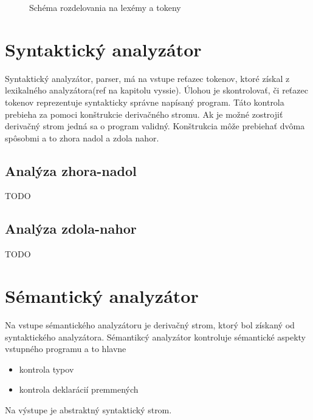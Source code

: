 \begin{center}
\begin{figure}
\caption{Schéma rozdelovania na lexémy a tokeny}
\label{fig:lex}

\end{figure}
\end{center}


\section{Syntaktický analyzátor}
Syntaktický analyzátor, parser, má na vstupe reťazec tokenov, ktoré získal
z lexikalného analyzátora(ref na kapitolu vyssie). Úlohou je skontrolovať, či
reťazec tokenov reprezentuje syntakticky správne napísaný program. Táto kontrola
prebieha za pomoci konštrukcie derivačného stromu. Ak je možné zostrojiť derivačný strom
jedná sa o program validný. Konštrukcia môže prebiehať dvôma spôsobmi a to zhora
nadol a zdola nahor.

\subsection{Analýza zhora-nadol}
TODO
\subsection{Analýza zdola-nahor}
TODO

\section{Sémantický analyzátor}
Na vstupe sémantického analyzátoru je derivačný strom, ktorý bol získaný od
syntaktického analyzátora. Sémantikcý analyzátor kontroluje sémantické aspekty
vstupného programu a to hlavne 
\begin{itemize}
    \item kontrola typov
    \item kontrola deklarácií premmených
\end{itemize}
Na výstupe je abstraktný syntaktický strom.

